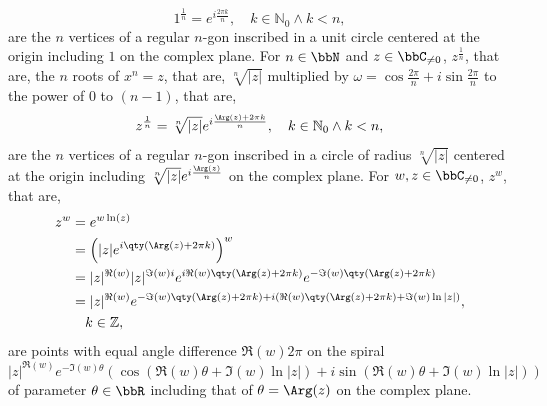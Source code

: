 \documentclass[a4paper,12pt]{article}
\begin{document}
\[1^{\frac{1}{n}}=e^{i\frac{2\pi k}{n}},\quad k\in\mathbb{N}_0\land k<n,\]
are the $n$ vertices of a regular $n$-gon inscribed in a unit circle centered at the origin including $1$ on the complex plane.
For $n\in\bbN$ and $z\in\bbC_{\neq 0}$, $z^{\frac{1}{n}}$, that are, the $n$ roots of $x^n=z$, that are, $\sqrt[n]{|z|}$ multiplied by $\omega=\cos\frac{2\pi}{n}+i\sin\frac{2\pi}{n}$ to the power of $0$ to $(n-1)$, that are,
\[z^{\frac{1}{n}}=\sqrt[n]{|z|}e^{i\frac{\Arg(z)+2\pi k}{n}},\quad k\in\mathbb{N}_0\land k<n,\]
are the $n$ vertices of a regular $n$-gon inscribed in a circle of radius $\sqrt[n]{|z|}$ centered at the origin including $\sqrt[n]{|z|}e^{i\frac{\Arg(z)}{n}}$ on the complex plane.
For $w,z\in\bbC_{\neq 0}$, $z^w$, that are,
\[\begin{aligned}
z^w&=e^{w\ln(z)}\\
&=\left(|z|e^{i\qty(\Arg(z)+2\pi k)}\right)^w\\
&=|z|^{\Re(w)}|z|^{\Im(w)i}e^{i\Re(w)\qty(\Arg(z)+2\pi k)}e^{-\Im(w)\qty(\Arg(z)+2\pi k)}\\
&=|z|^{\Re(w)}e^{-\Im(w)\qty(\Arg(z)+2\pi k)+i(\Re(w)\qty(\Arg(z)+2\pi k)+\Im(w)\ln|z|)},\\
&\quad k\in\mathbb{Z},
\end{aligned}\]
are points with equal angle difference $\Re(w)2\pi$ on the spiral
\[|z|^{\Re(w)}e^{-\Im(w)\theta}\left(\cos(\Re(w)\theta+\Im(w)\ln|z|)+i\sin(\Re(w)\theta+\Im(w)\ln|z|)\right)\]
of parameter $\theta\in\bbR$ including that of $\theta=\Arg(z)$ on the complex plane.
\end{document}
